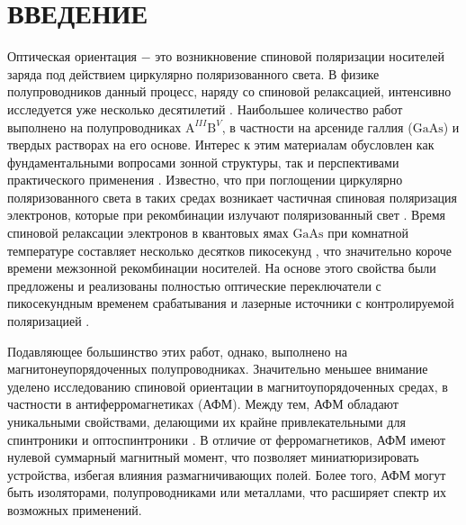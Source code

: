 \documentclass[14pt]{extarticle}
\newcommand{\gaas}{\mathrm{Ga}\mathrm{As}}
\numberwithin{equation}{section}
\begin{document}
\tableofcontents
\setcounter{page}{2}
\newpage



\newpage


\section*{ВВЕДЕНИЕ}

    

Оптическая ориентация $-$ это возникновение спиновой поляризации носителей заряда под действием циркулярно поляризованного света. В физике полупроводников данный процесс, наряду со спиновой релаксацией, интенсивно исследуется уже несколько десятилетий \cite{zakharchenya_opt_or, Dyakonov_Spin_Physics_2017}. Наибольшее количество работ выполнено на полупроводниках $\mathrm{A}^{III} \mathrm{B}^V$, в частности на арсениде галлия ($\gaas$) и твердых растворах на его основе\cite{zakharchenya_opt_or, Ragoza_GaAs, Dzhioev_Kavokin, Hilton2001, Pfalz}. Интерес к этим материалам обусловлен как фундаментальными вопросами зонной структуры, так и перспективами практического применения \cite{zakharchenya_opt_or, Dyakonov_Spin_Physics_2017}. Известно, что при поглощении циркулярно поляризованного света в таких средах возникает частичная спиновая поляризация электронов, которые при рекомбинации излучают поляризованный свет \cite{Lampel}. Время спиновой релаксации электронов в квантовых ямах $\gaas$ при комнатной температуре составляет несколько десятков пикосекунд \cite{Tackeuchi}, что значительно короче времени межзонной рекомбинации носителей. На основе этого свойства были предложены и реализованы полностью оптические переключатели с пикосекундным временем срабатывания \cite{Teng_2008} и лазерные источники с контролируемой поляризацией \cite{Ando_1998}.

Подавляющее большинство этих работ, однако, выполнено на магнитонеупорядоченных полупроводниках. Значительно меньшее внимание уделено исследованию  спиновой ориентации  в магнитоупорядоченных средах, в частности в антиферромагнетиках (АФМ). Между тем, АФМ обладают уникальными свойствами, делающими их крайне привлекательными для спинтроники и оптоспинтроники \cite{ AFM_spintronics, AFM_optospintronics, AFM_Devices}. В отличие от ферромагнетиков, АФМ имеют нулевой суммарный магнитный момент, что позволяет миниатюризировать устройства, избегая влияния размагничивающих полей. Более того, АФМ могут быть изоляторами, полупроводниками или металлами, что расширяет спектр их возможных применений. 
\end{document}
